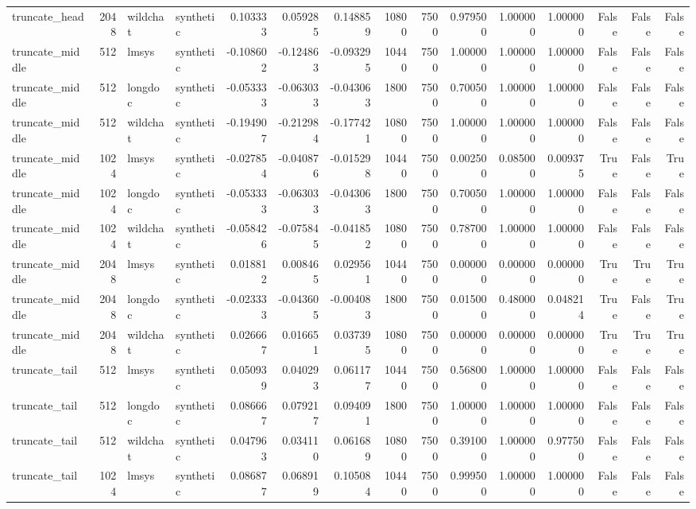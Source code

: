 \begin{tabular}{lrllrrrrrrrrrrr}
truncate_head & 2048 & wildchat & synthetic & 0.103333 & 0.059285 & 0.148859 & 10800 & 7500 & 0.979500 & 1.000000 & 1.000000 & False & False & False \\
truncate_middle & 512 & lmsys & synthetic & -0.108602 & -0.124863 & -0.093295 & 10440 & 7500 & 1.000000 & 1.000000 & 1.000000 & False & False & False \\
truncate_middle & 512 & longdoc & synthetic & -0.053333 & -0.063033 & -0.043063 & 1800 & 7500 & 0.700500 & 1.000000 & 1.000000 & False & False & False \\
truncate_middle & 512 & wildchat & synthetic & -0.194907 & -0.212984 & -0.177421 & 10800 & 7500 & 1.000000 & 1.000000 & 1.000000 & False & False & False \\
truncate_middle & 1024 & lmsys & synthetic & -0.027854 & -0.040876 & -0.015298 & 10440 & 7500 & 0.002500 & 0.085000 & 0.009375 & True & False & True \\
truncate_middle & 1024 & longdoc & synthetic & -0.053333 & -0.063033 & -0.043063 & 1800 & 7500 & 0.700500 & 1.000000 & 1.000000 & False & False & False \\
truncate_middle & 1024 & wildchat & synthetic & -0.058426 & -0.075845 & -0.041852 & 10800 & 7500 & 0.787000 & 1.000000 & 1.000000 & False & False & False \\
truncate_middle & 2048 & lmsys & synthetic & 0.018812 & 0.008465 & 0.029561 & 10440 & 7500 & 0.000000 & 0.000000 & 0.000000 & True & True & True \\
truncate_middle & 2048 & longdoc & synthetic & -0.023333 & -0.043605 & -0.004083 & 1800 & 7500 & 0.015000 & 0.480000 & 0.048214 & True & False & True \\
truncate_middle & 2048 & wildchat & synthetic & 0.026667 & 0.016651 & 0.037395 & 10800 & 7500 & 0.000000 & 0.000000 & 0.000000 & True & True & True \\
truncate_tail & 512 & lmsys & synthetic & 0.050939 & 0.040293 & 0.061177 & 10440 & 7500 & 0.568000 & 1.000000 & 1.000000 & False & False & False \\
truncate_tail & 512 & longdoc & synthetic & 0.086667 & 0.079217 & 0.094091 & 1800 & 7500 & 1.000000 & 1.000000 & 1.000000 & False & False & False \\
truncate_tail & 512 & wildchat & synthetic & 0.047963 & 0.034110 & 0.061689 & 10800 & 7500 & 0.391000 & 1.000000 & 0.977500 & False & False & False \\
truncate_tail & 1024 & lmsys & synthetic & 0.086877 & 0.068919 & 0.105084 & 10440 & 7500 & 0.999500 & 1.000000 & 1.000000 & False & False & False \\

\end{tabular}
